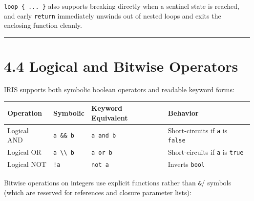 \documentclass[
  english,
  oneside]{book}
\newcounter{none} %
\begin{document}
\texttt{loop\ \{\ ...\ \}} also supports breaking directly when a
sentinel state is reached, and early \texttt{return} immediately unwinds
out of nested loops and exits the enclosing function cleanly.

\begin{center}\rule{0.5\linewidth}{0.5pt}\end{center}

\section{4.4 Logical and Bitwise
Operators}\label{logical-and-bitwise-operators}

IRIS supports both symbolic boolean operators and readable keyword
forms:

{\def\LTcaptype{none} %
\begin{longtable}[]{@{}
  >{\raggedright\arraybackslash}p{}
  >{\raggedright\arraybackslash}p{}
  >{\raggedright\arraybackslash}p{}
  >{\raggedright\arraybackslash}p{}@{}}
\toprule\noalign{}
\begin{minipage}[b]{\linewidth}\raggedright
Operation
\end{minipage} & \begin{minipage}[b]{\linewidth}\raggedright
Symbolic
\end{minipage} & \begin{minipage}[b]{\linewidth}\raggedright
Keyword Equivalent
\end{minipage} & \begin{minipage}[b]{\linewidth}\raggedright
Behavior
\end{minipage} \\
\midrule\noalign{}
\endhead
\bottomrule\noalign{}
\endlastfoot
Logical AND & \texttt{a\ \&\&\ b} & \texttt{a\ and\ b} & Short-circuits
if \texttt{a} is \texttt{false} \\
Logical OR &
\texttt{a\ \textbackslash{}\textbar{}\textbackslash{}\textbar{}\ b} &
\texttt{a\ or\ b} & Short-circuits if \texttt{a} is \texttt{true} \\
Logical NOT & \texttt{!a} & \texttt{not\ a} & Inverts \texttt{bool} \\
\end{longtable}
}

Bitwise operations on integers use explicit functions rather than
\texttt{\&}/\texttt{\textbar{}} symbols (which are reserved for
references and closure parameter lists):
\end{document}
